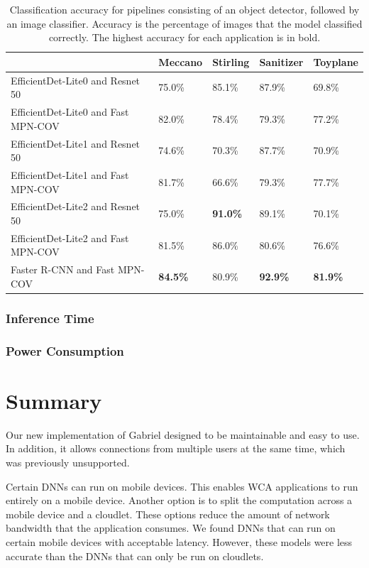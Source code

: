 \begin{table}
\begin{tabular}{|l||l|l|l|l|}
  \hline
  & Meccano & Stirling & Sanitizer & Toyplane\\
  \hline
  \hline
  EfficientDet-Lite0 and Resnet 50 & 75.0\% & 85.1\% & 87.9\% & 69.8\%\\
  EfficientDet-Lite0 and Fast MPN-COV & 82.0\% & 78.4\% & 79.3\% & 77.2\%\\
  EfficientDet-Lite1 and Resnet 50 & 74.6\% & 70.3\% & 87.7\% & 70.9\%\\
  EfficientDet-Lite1 and Fast MPN-COV & 81.7\% & 66.6\% & 79.3\% & 77.7\%\\
  EfficientDet-Lite2 and Resnet 50 & 75.0\% & \textbf{91.0\%} & 89.1\% & 70.1\%\\
  EfficientDet-Lite2 and Fast MPN-COV & 81.5\% & 86.0\% & 80.6\% & 76.6\%\\
  Faster R-CNN and Fast MPN-COV & \textbf{84.5\%} & 80.9\% & \textbf{92.9\%} & \textbf{81.9\%}\\
  \hline
\end{tabular}
  \caption{
    Classification accuracy for pipelines consisting of an object detector,
    followed by an image classifier.
    Accuracy is the percentage of images that the model classified correctly.
    The highest accuracy for each application is in bold.
  }\label{tab:pipeline_accuracy}
\end{table}

\subsubsection{Inference Time}

\subsubsection{Power Consumption}

\section{Summary}

Our new implementation of Gabriel designed to be maintainable and easy to use.
In addition, it allows connections from multiple users at the same time, which
was previously unsupported.

Certain DNNs can run on mobile devices.
This enables WCA applications to run entirely on a mobile device.
Another option is to split the computation across a mobile device and a
cloudlet.
These options reduce the amount of network bandwidth that the application
consumes.
We found DNNs that can run on certain mobile devices with acceptable latency.
However, these models were less accurate than the DNNs that can only be run on
cloudlets.
